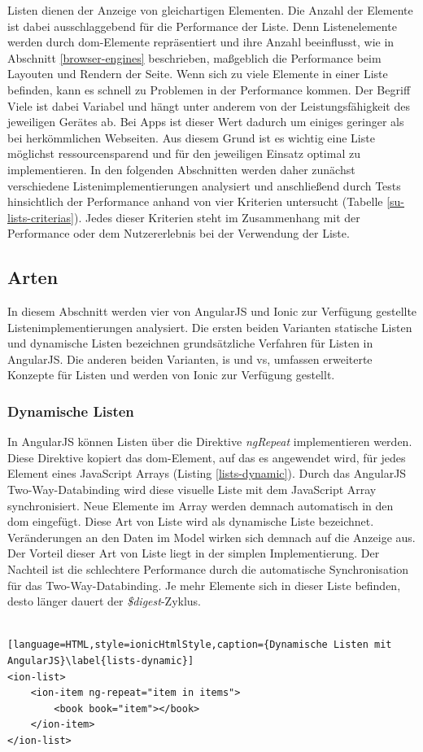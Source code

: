 Listen dienen der Anzeige von gleichartigen Elementen. Die Anzahl der Elemente ist dabei ausschlaggebend für die Performance der Liste. Denn Listenelemente werden durch \gls{dom}-Elemente repräsentiert und ihre Anzahl beeinflusst, wie in Abschnitt \ref{browser-engines} beschrieben, maßgeblich die Performance beim Layouten und Rendern der Seite. Wenn sich zu viele Elemente in einer Liste befinden, kann es schnell zu Problemen in der Performance kommen. Der Begriff \glqq Viele\grqq{} ist dabei Variabel und hängt unter anderem von der Leistungsfähigkeit des jeweiligen Gerätes ab. Bei Apps ist dieser Wert dadurch um einiges geringer als bei herkömmlichen Webseiten. Aus diesem Grund ist es wichtig eine Liste möglichst ressourcensparend und für den jeweiligen Einsatz optimal zu implementieren. In den folgenden Abschnitten werden daher zunächst verschiedene Listenimplementierungen analysiert und anschließend durch Tests hinsichtlich der Performance anhand von vier Kriterien untersucht (Tabelle \ref{su-lists-criterias}). Jedes dieser Kriterien steht im Zusammenhang mit der Performance oder dem Nutzererlebnis bei der Verwendung der Liste. 

\subsection{Arten}
In diesem Abschnitt werden vier von AngularJS und Ionic zur Verfügung gestellte Listenimplementierungen analysiert. Die ersten beiden Varianten \glqq statische Listen\grqq{} und \glqq dynamische Listen\grqq{} bezeichnen grundsätzliche Verfahren für Listen in AngularJS. Die anderen beiden Varianten, \gls{is} und \gls{vs}, umfassen erweiterte Konzepte für Listen und werden von Ionic zur Verfügung gestellt.

\subsubsection{Dynamische Listen}
In AngularJS können Listen über die Direktive \emph{ngRepeat} implementieren werden. Diese Direktive kopiert das \gls{dom}-Element, auf das es angewendet wird, für jedes Element eines JavaScript Arrays (Listing \ref{lists-dynamic}). Durch das AngularJS Two-Way-Databinding wird diese visuelle Liste mit dem JavaScript Array synchronisiert. Neue Elemente im Array werden demnach automatisch in den \gls{dom} eingefügt. Diese Art von Liste wird als dynamische Liste bezeichnet. Veränderungen an den Daten im Model wirken sich demnach auf die Anzeige aus. Der Vorteil dieser Art von Liste liegt in der simplen Implementierung. Der Nachteil ist die schlechtere Performance durch die automatische Synchronisation für das Two-Way-Databinding. Je mehr Elemente sich in dieser Liste befinden, desto länger dauert der \emph{\$digest}-Zyklus.\\\\
\begin{lstlisting}[language=HTML,style=ionicHtmlStyle,caption={Dynamische Listen mit AngularJS}\label{lists-dynamic}]
<ion-list>
	<ion-item ng-repeat="item in items">
		<book book="item"></book>
	</ion-item>
</ion-list>
\end{lstlisting}

